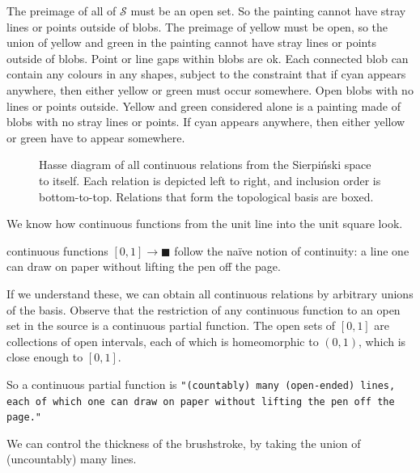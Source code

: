  The preimage of all of $\mathcal{S}$ must be an open set. So the painting cannot have stray lines or points outside of blobs. The preimage of yellow must be open, so the union of yellow and green in the painting cannot have stray lines or points outside of blobs. Point or line gaps within blobs are ok. Each connected blob can contain any colours in any shapes, subject to the constraint that if cyan appears anywhere, then either yellow or green must occur somewhere. Open blobs with no lines or points outside. Yellow and green considered alone is a painting made of blobs with no stray lines or points. If cyan appears anywhere, then either yellow or green have to appear somewhere.

\begin{figure}\label{fig:hassesierpinski}
\centering
{}
\caption{Hasse diagram of all continuous relations from the Sierpi\'{n}ski space to itself. Each relation is depicted left to right, and inclusion order is bottom-to-top. Relations that form the topological basis are boxed.}
\end{figure}

\clearpage

 We know how continuous functions from the unit line into the unit square look.
\begin{marginfigure}
\centering
{}
\caption{
continuous functions $[0,1] \rightarrow \blacksquare$ follow the na\"{i}ve notion of continuity: a line one can draw on paper without lifting the pen off the page.
}
\label{fig:contline}
\end{marginfigure}
 If we understand these, we can obtain all continuous relations by arbitrary unions of the basis. Observe that the restriction of any continuous function to an open set in the source is a continuous partial function. The open sets of $[0,1]$ are collections of open intervals, each of which is homeomorphic to $(0,1)$, which is close enough to $[0,1]$.
%
\begin{marginfigure}
\centering
{}
\caption{
So a continuous partial function is \texttt{"(countably) many (open-ended) lines, each of which one can draw on paper without lifting the pen off the page."}
}
\label{fig:contline}
\end{marginfigure}
%
\begin{marginfigure}
\centering
{}
\caption{We can control the thickness of the brushstroke, by taking the union of (uncountably) many lines.}
\label{fig:thickbrush}
\end{marginfigure}

